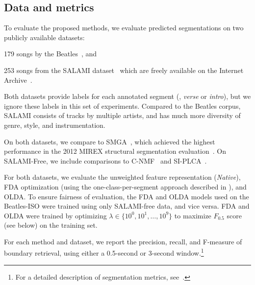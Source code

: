 \documentclass{article}
\begin{document}
\subsection{Data and metrics}
To evaluate the proposed methods, we evaluate predicted segmentations on two publicly available datasets:
\begin{description}\addtolength{\itemsep}{-0.25\baselineskip}%
\item[Beatles-ISO] 179 songs by the Beatles~\cite{harte2010towards,isophonicsbeatles}, and
\item[SALAMI-free] 253 songs from the SALAMI dataset~\cite{smith2011design} which are freely available on the 
Internet Archive~\cite{nieto2013convex}.
\end{description}
Both datasets provide labels for each annotated segment (\eg, \emph{verse} or \emph{intro}), but we ignore these
labels in this set of experiments. Compared to the Beatles corpus, SALAMI consists of tracks by multiple artists, 
and has much more diversity of genre, style, and instrumentation.

On both datasets, we compare to SMGA~\cite{serra2012unsupervised}, which achieved the
highest performance in the 2012 MIREX structural segmentation evaluation~\cite{Downie2008}.
On SALAMI-Free, we include comparisons to C-NMF~\cite{nieto2013convex} and SI-PLCA~\cite{weiss2011unsupervised}.

For both datasets, we evaluate the unweighted feature representation (\emph{Native}), FDA optimization (using the
one-class-per-segment approach described in ), and OLDA.\@
To ensure fairness of evaluation, the FDA and OLDA models used on the Beatles-ISO were trained using only
SALAMI-free data, and vice versa.  FDA and OLDA were trained by optimizing $\lambda \in \{10^0, 10^1, \dots, 10^9\}$
to maximize $F_{0.5}$ score (see below) on the training set.

For each method and dataset, we report the precision, recall, and F-measure of boundary retrieval, using either a 0.5-second or 3-second window.\footnote{
For a detailed description of segmentation metrics, see~\cite{mirexstructure}.}
\end{document}

